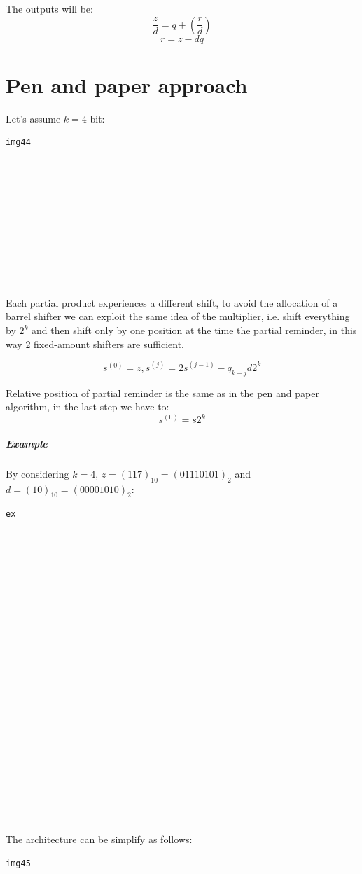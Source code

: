 The outputs will be:
$$\frac{z}{d}=q+(\frac{r}{d})$$
$$r=z-dq$$

\section{Pen and paper approach}

Let's assume $k=4$ bit:

\begin{verbatim}
img44











\end{verbatim}

Each partial product experiences a different shift, to avoid the allocation of a barrel shifter we can exploit the same idea of the multiplier, i.e. shift everything by $2^k$ and then shift only by one position at the time the partial reminder, in this way 2 fixed-amount shifters are sufficient.

$$s^{(0)}=z , s^{(j)}=2s^{(j-1)}-q_{k-j}d2^k$$

Relative position of partial reminder is the same as in the pen and paper algorithm, in the last step we have to:
$$s^{(0)}=s2^k$$

\subparagraph{Example}
By considering $k=4$, $z=(117)_{10}=(01110101)_2$ and $d=(10)_{10}=(00001010)_2$:

\begin{verbatim}
ex























\end{verbatim}

The architecture can be simplify as follows:

\begin{verbatim}
img45














\end{verbatim}

